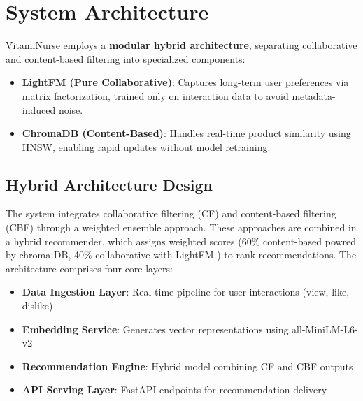 \section{System Architecture}
VitamiNurse employs a \textbf{modular hybrid architecture}, separating collaborative and content-based filtering into specialized components:
\begin{itemize}
    \item \textbf{LightFM (Pure Collaborative)}: Captures long-term user preferences via matrix factorization, trained only on interaction data to avoid metadata-induced noise.
    \item \textbf{ChromaDB (Content-Based)}: Handles real-time product similarity using HNSW, enabling rapid updates without model retraining.
\end{itemize}

\subsection{Hybrid Architecture Design}
The system integrates collaborative filtering (CF) and content-based filtering (CBF) through a weighted ensemble approach. These approaches are combined in a hybrid recommender, which assigns weighted scores (60\% content-based powred by chroma DB, 40\% collaborative with LightFM ) to rank recommendations. The architecture comprises four core layers:
\begin{itemize}
    \item \textbf{Data Ingestion Layer}: Real-time pipeline for user interactions (view, like, dislike)
    \item \textbf{Embedding Service}: Generates vector representations using all-MiniLM-L6-v2
    \item \textbf{Recommendation Engine}: Hybrid model combining CF and CBF outputs
    \item \textbf{API Serving Layer}: FastAPI endpoints for recommendation delivery
\end{itemize}


